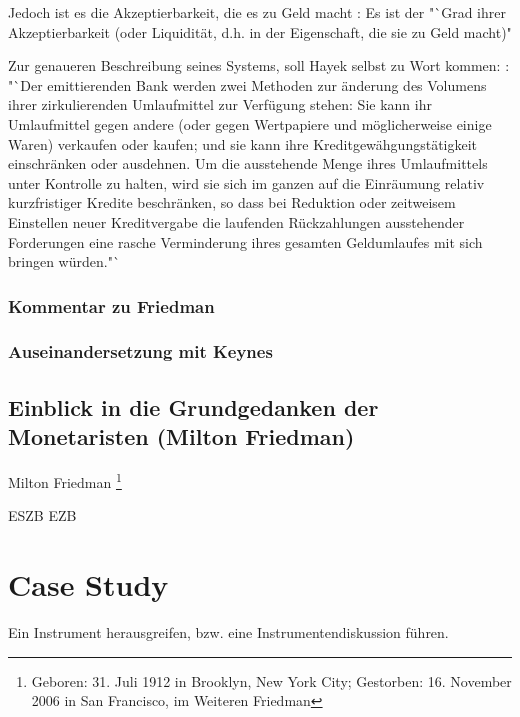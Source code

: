 \documentclass[
        onecolumn,
        a4paper,
        abstracton,
        parskip=half
        ,final
        ]{scrartcl}
\begin{document}
Jedoch ist es die Akzeptierbarkeit, die es zu Geld macht \citep[vgl.][S.40]{Hayek1977}: Es ist der "`Grad ihrer Akzeptierbarkeit (oder Liquidit{\"a}t, d.h. in der Eigenschaft, die sie zu Geld macht)"

Zur genaueren Beschreibung seines Systems, soll Hayek selbst zu Wort kommen: \citep[vgl.][S.45]{Hayek1977}: "`Der emittierenden Bank werden zwei Methoden zur {\"a}nderung des Volumens ihrer zirkulierenden Umlaufmittel zur Verf{\"u}gung stehen: Sie kann ihr Umlaufmittel gegen andere (oder gegen Wertpapiere und m{\"o}glicherweise einige Waren) verkaufen oder kaufen; und sie kann ihre Kreditgew{\"a}hgungst{\"a}tigkeit einschr{\"a}nken oder ausdehnen. Um die ausstehende Menge ihres Umlaufmittels unter Kontrolle zu halten, wird sie sich im ganzen auf die Einr{\"a}umung relativ kurzfristiger Kredite beschr{\"a}nken, so dass bei Reduktion oder zeitweisem Einstellen neuer Kreditvergabe die laufenden R{\"u}ckzahlungen ausstehender Forderungen eine rasche Verminderung ihres gesamten Geldumlaufes mit sich bringen w{\"u}rden."`

\subsubsection{Kommentar zu Friedman}

\subsubsection{Auseinandersetzung mit Keynes}









\subsection{Einblick in die Grundgedanken der Monetaristen (Milton Friedman)}
Milton Friedman \footnote[16]{Geboren: 31. Juli 1912 in Brooklyn, New York City; Gestorben: 16. November 2006 in San Francisco, im Weiteren Friedman}

\clearpage
\ac{ESZB}
\ac{EZB}



\section{Case Study}
\label{sec4:CaseStudy}
Ein Instrument herausgreifen, bzw. eine Instrumentendiskussion f{\"u}hren.
\end{document}
